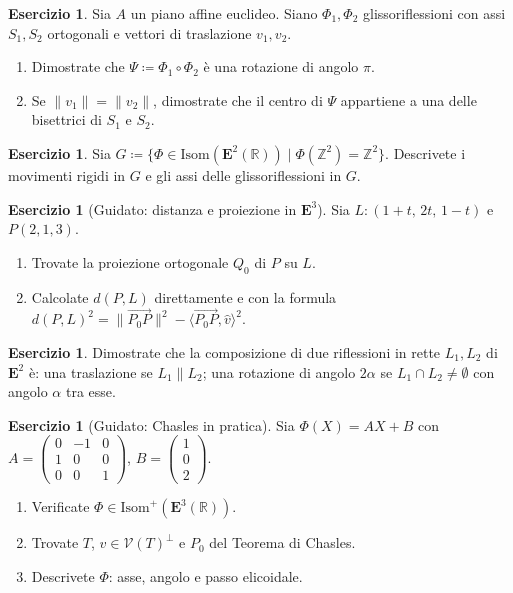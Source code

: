 \documentclass[11pt, a4paper]{book}
\theoremstyle{definition}
\newtheorem{esercizio}[definizione]{Esercizio}
\theoremstyle{plain}
\theoremstyle{remark}
\newcommand{\Z}{\mathbb{Z}}
\newcommand{\R}{\mathbb{R}}
\begin{document}
\begin{esercizio}
Sia $A$ un piano affine euclideo. Siano $\Phi_1,\Phi_2$ glissoriflessioni con assi $S_1,S_2$ ortogonali e vettori di traslazione $v_1,v_2$.
\begin{enumerate}
  \item Dimostrate che $\Psi \coloneqq \Phi_1\circ\Phi_2$ è una rotazione di angolo $\pi$.
  \item Se $\|v_1\|=\|v_2\|$, dimostrate che il centro di $\Psi$ appartiene a una delle bisettrici di $S_1$ e $S_2$.
\end{enumerate}
\end{esercizio}

\begin{esercizio}
Sia $G \coloneqq \{\Phi \in \mathrm{Isom}(\mathbf{E}^2(\R)) \mid \Phi(\Z^2)=\Z^2\}$. Descrivete i movimenti rigidi in $G$ e gli assi delle glissoriflessioni in $G$.
\end{esercizio}

\begin{esercizio}[Guidato: distanza e proiezione in $\mathbf{E}^3$]
Sia $L \colon (1+t,\,2t,\,1-t)$ e $P(2,1,3)$.
\begin{enumerate}
  \item Trovate la proiezione ortogonale $Q_0$ di $P$ su $L$.
  \item Calcolate $d(P,L)$ direttamente e con la formula $d(P,L)^2 = \|\overrightarrow{P_0 P}\|^2 - \langle\overrightarrow{P_0 P},\hat{v}\rangle^2$.
\end{enumerate}
\end{esercizio}

\begin{esercizio}
Dimostrate che la composizione di due riflessioni in rette $L_1,L_2$ di $\mathbf{E}^2$ è: una traslazione se $L_1\parallel L_2$; una rotazione di angolo $2\alpha$ se $L_1\cap L_2\neq\emptyset$ con angolo $\alpha$ tra esse.
\end{esercizio}

\begin{esercizio}[Guidato: Chasles in pratica]
Sia $\Phi(X)=AX+B$ con $A=\begin{pmatrix}0&-1&0\\1&0&0\\0&0&1\end{pmatrix}$, $B=\begin{pmatrix}1\\0\\2\end{pmatrix}$.
\begin{enumerate}
  \item Verificate $\Phi \in \mathrm{Isom}^+(\mathbf{E}^3(\R))$.
  \item Trovate $T$, $v \in \mathcal{V}(T)^\perp$ e $P_0$ del Teorema di Chasles.
  \item Descrivete $\Phi$: asse, angolo e passo elicoidale.
\end{enumerate}
\end{esercizio}
\end{document}
